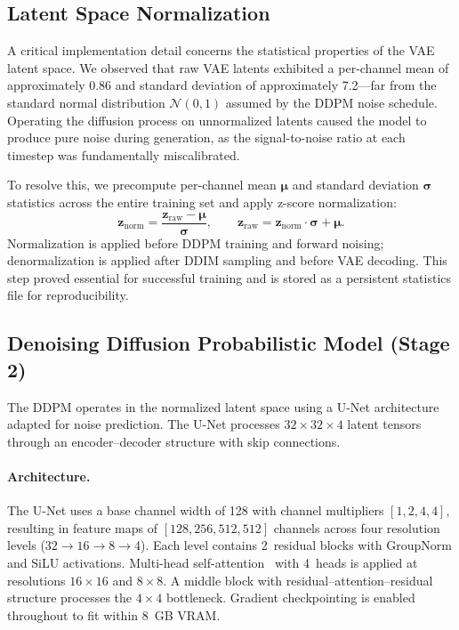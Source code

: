\subsection{Latent Space Normalization}
\label{sec:normalization}

A critical implementation detail concerns the statistical properties of the VAE latent space. We observed that raw VAE latents exhibited a per-channel mean of approximately 0.86 and standard deviation of approximately 7.2---far from the standard normal distribution $\mathcal{N}(0, 1)$ assumed by the DDPM noise schedule. Operating the diffusion process on unnormalized latents caused the model to produce pure noise during generation, as the signal-to-noise ratio at each timestep was fundamentally miscalibrated.

To resolve this, we precompute per-channel mean $\boldsymbol{\mu}$ and standard deviation $\boldsymbol{\sigma}$ statistics across the entire training set and apply z-score normalization:
\begin{equation}
\mathbf{z}_{\text{norm}} = \frac{\mathbf{z}_{\text{raw}} - \boldsymbol{\mu}}{\boldsymbol{\sigma}}, \qquad
\mathbf{z}_{\text{raw}} = \mathbf{z}_{\text{norm}} \cdot \boldsymbol{\sigma} + \boldsymbol{\mu}.
\label{eq:normalization}
\end{equation}
Normalization is applied before DDPM training and forward noising; denormalization is applied after DDIM sampling and before VAE decoding. This step proved essential for successful training and is stored as a persistent statistics file for reproducibility.

\subsection{Denoising Diffusion Probabilistic Model (Stage 2)}
\label{sec:ddpm}

The DDPM operates in the normalized latent space using a U-Net architecture~\cite{ronneberger2015u} adapted for noise prediction. The U-Net processes $32 \times 32 \times 4$ latent tensors through an encoder--decoder structure with skip connections.

\paragraph{Architecture.} The U-Net uses a base channel width of 128 with channel multipliers $[1, 2, 4, 4]$, resulting in feature maps of $[128, 256, 512, 512]$ channels across four resolution levels ($32 \rightarrow 16 \rightarrow 8 \rightarrow 4$). Each level contains 2~residual blocks with GroupNorm and SiLU activations. Multi-head self-attention~\cite{vaswani2017attention} with 4~heads is applied at resolutions $16 \times 16$ and $8 \times 8$. A middle block with residual--attention--residual structure processes the $4 \times 4$ bottleneck. Gradient checkpointing is enabled throughout to fit within 8~GB VRAM.

